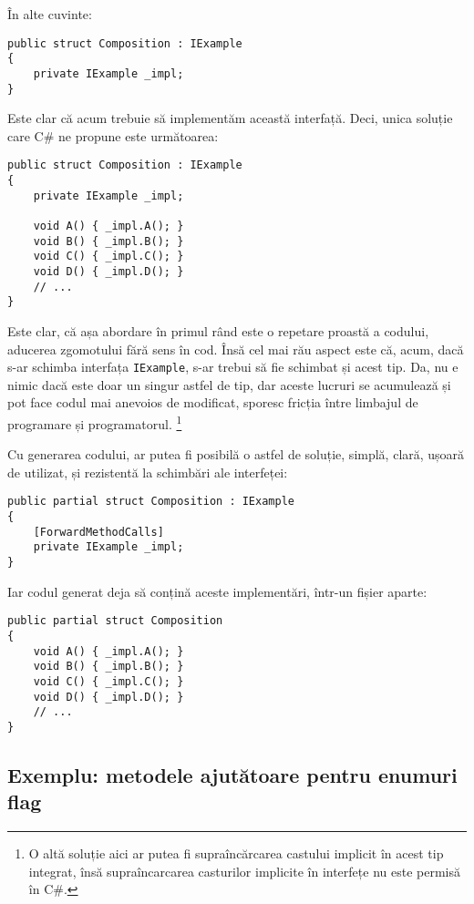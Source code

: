 \documentclass[a4paper,12pt]{report}
\begin{document}
În alte cuvinte:

\begin{verbatim}
public struct Composition : IExample
{
    private IExample _impl;
}
\end{verbatim}

Este clar că acum trebuie să implementăm această interfață.
Deci, unica soluție care C\# ne propune este următoarea:

\begin{verbatim}
public struct Composition : IExample
{
    private IExample _impl;

    void A() { _impl.A(); }
    void B() { _impl.B(); }
    void C() { _impl.C(); }
    void D() { _impl.D(); }
    // ...
}
\end{verbatim}

Este clar, că așa abordare în primul rând este o repetare proastă a codului, aducerea zgomotului fără sens în cod.
Însă cel mai rău aspect este că, acum, dacă s-ar schimba interfața \texttt{IExample}, s-ar trebui să fie schimbat și acest tip.
Da, nu e nimic dacă este doar un singur astfel de tip, dar aceste lucruri se acumulează și pot face codul mai anevoios de modificat, sporesc fricția între limbajul de programare și programatorul. \footnote{
  O altă soluție aici ar putea fi supraîncărcarea castului implicit în acest tip integrat,
  însă supraîncarcarea casturilor implicite în interfețe nu este permisă în C\#.
}

Cu generarea codului, ar putea fi posibilă o astfel de soluție, simplă, clară, ușoară de utilizat, și rezistentă la schimbări ale interfeței:

\begin{verbatim}
public partial struct Composition : IExample
{
    [ForwardMethodCalls]
    private IExample _impl;
}
\end{verbatim}

Iar codul generat deja să conțină aceste implementări, într-un fișier aparte:

\begin{verbatim}
public partial struct Composition
{
    void A() { _impl.A(); }
    void B() { _impl.B(); }
    void C() { _impl.C(); }
    void D() { _impl.D(); }
    // ...
}
\end{verbatim}


\subsection{Exemplu: metodele ajutătoare pentru enumuri flag}
\end{document}
